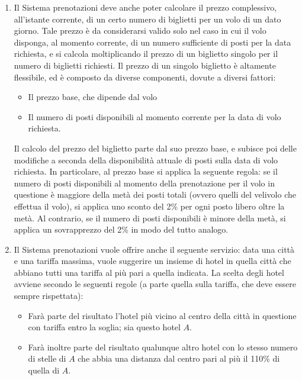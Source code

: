 \documentclass[a4paper,12pt]{report}
\begin{document}
\begin{enumerate}[label=\arabic*.]
\begin{enumerate}[label*=\arabic*.]
          \newpage

          \item Il Sistema prenotazioni deve anche poter calcolare il prezzo complessivo, all’istante corrente, di un certo numero di biglietti per un volo di un dato giorno. Tale prezzo è
                da considerarsi valido solo nel caso in cui il volo disponga, al momento corrente, di un numero sufficiente di posti per la data richiesta, e si calcola moltiplicando il prezzo di
                un biglietto singolo per il numero di biglietti richiesti. Il prezzo di un singolo biglietto è altamente flessibile, ed è composto da diverse componenti, dovute a diversi fattori:
                \begin{itemize}
                  \item Il prezzo base, che dipende dal volo
                  \item Il numero di posti disponibili al momento corrente per la data di volo richiesta.
                \end{itemize}
                Il calcolo del prezzo del biglietto parte dal suo prezzo base, e subisce poi delle modifiche a seconda della disponibilità attuale di posti sulla data di volo richiesta.
                In particolare, al prezzo base si applica la seguente regola: se il numero di posti disponibili al momento della prenotazione per il volo in questione è maggiore della metà
                dei posti totali (ovvero quelli del velivolo che effettua il volo), si applica uno sconto del 2\% per ogni posto libero oltre la metà. Al contrario, se il numero di posti
                disponibili è minore della metà, si applica un sovrapprezzo del 2\% in modo del tutto analogo.
          \item Il Sistema prenotazioni vuole offrire anche il seguente servizio: data una città e una tariffa massima, vuole suggerire un insieme di hotel in quella città che abbiano tutti una
                tariffa al più pari a quella indicata. La scelta degli hotel avviene secondo le seguenti regole (a parte quella sulla tariffa, che deve essere sempre rispettata):
                \begin{itemize}
                  \item Farà parte del risultato l’hotel più vicino al centro della città in questione con tariffa entro la soglia; sia questo hotel $A$.
                  \item Farà inoltre parte del risultato qualunque altro hotel con lo stesso numero di stelle di $A$ che abbia una distanza dal centro pari al più il 110\% di quella di $A$.

\end{itemize}
\end{enumerate}
\end{enumerate}
\end{document}
